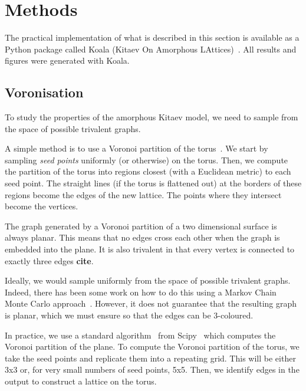 \begin{Shaded}
\begin{Highlighting}[]

\end{Highlighting}
\end{Shaded}

\hypertarget{sec:AMK-Methods}{%
\section{Methods}\label{sec:AMK-Methods}}

The practical implementation of what is described in this section is available as a Python package called Koala (Kitaev On Amorphous LAttices)~\autocite{tomImperialCMTHKoalaFirst2022}. All results and figures were generated with Koala.

\hypertarget{voronisation}{%
\subsection{Voronisation}\label{voronisation}}

To study the properties of the amorphous Kitaev model, we need to sample from the space of possible trivalent graphs.

A simple method is to use a Voronoi partition of the torus~\autocite{mitchellAmorphousTopologicalInsulators2018,marsalTopologicalWeaireThorpeModels2020,florescu_designer_2009}. We start by sampling \emph{seed points} uniformly (or otherwise) on the torus. Then, we compute the partition of the torus into regions closest (with a Euclidean metric) to each seed point. The straight lines (if the torus is flattened out) at the borders of these regions become the edges of the new lattice. The points where they intersect become the vertices.

The graph generated by a Voronoi partition of a two dimensional surface is always planar. This means that no edges cross each other when the graph is embedded into the plane. It is also trivalent in that every vertex is connected to exactly three edges \textbf{cite}.

Ideally, we would sample uniformly from the space of possible trivalent graphs. Indeed, there has been some work on how to do this using a Markov Chain Monte Carlo approach~\autocite{alyamiUniformSamplingDirected2016}. However, it does not guarantee that the resulting graph is planar, which we must ensure so that the edges can be 3-coloured.

In practice, we use a standard algorithm~\autocite{barberQuickhullAlgorithmConvex1996} from Scipy~\autocite{virtanenSciPyFundamentalAlgorithms2020} which computes the Voronoi partition of the plane. To compute the Voronoi partition of the torus, we take the seed points and replicate them into a repeating grid. This will be either 3x3 or, for very small numbers of seed points, 5x5. Then, we identify edges in the output to construct a lattice on the torus.

